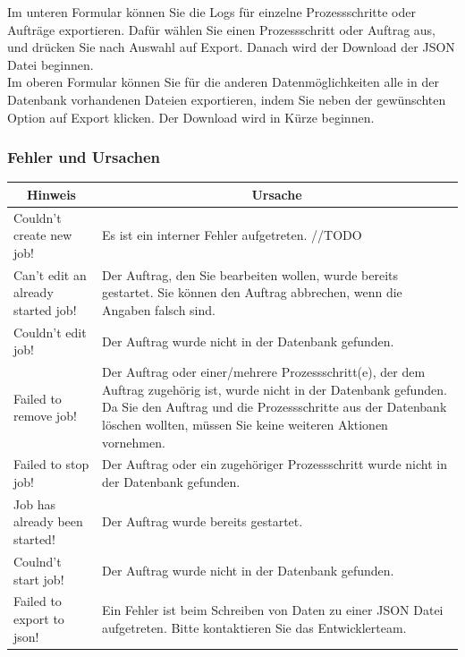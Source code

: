 \documentclass[enabledeprecatedfontcommands,fontsize=12pt,paper=a4,twoside]{scrartcl}
\begin{document}
Im unteren Formular können Sie die Logs für einzelne Prozessschritte oder Aufträge exportieren. Dafür wählen Sie einen Prozessschritt oder Auftrag aus, und drücken Sie nach Auswahl auf Export. Danach wird der Download der JSON Datei beginnen. \\

Im oberen Formular können Sie für die anderen Datenmöglichkeiten alle in der Datenbank vorhandenen Dateien exportieren, indem Sie neben der gewünschten Option auf Export klicken. Der Download wird in Kürze beginnen. \\

\subsubsection{Fehler und Ursachen}
\begin{longtable}[c]{|p{5cm}|p{10cm}|}
\hline
\multicolumn{1}{|c|}{\textbf{Hinweis}}                          & \multicolumn{1}{c|}{\textbf{Ursache}}                                                                                                                                                                                                               \\ \hline
\endhead
Couldn't create new job! &Es ist ein interner Fehler aufgetreten. //TODO \\ \hline
Can't edit an already started job! & Der Auftrag, den Sie bearbeiten wollen, wurde bereits gestartet. Sie können den Auftrag abbrechen, wenn die Angaben falsch sind. \\ \hline
Couldn't edit job! & Der Auftrag wurde nicht in der Datenbank gefunden. \\ \hline
Failed to remove job! & Der Auftrag oder einer/mehrere Prozessschritt(e), der dem Auftrag zugehörig ist, wurde nicht in der Datenbank gefunden. Da Sie den Auftrag und die Prozessschritte aus der Datenbank löschen wollten, müssen Sie keine weiteren Aktionen vornehmen. \\ \hline
Failed to stop job!  & Der Auftrag oder ein zugehöriger Prozessschritt wurde nicht in der Datenbank gefunden.  \\ \hline
Job has already been started!  & Der Auftrag wurde bereits gestartet. \\ \hline
Coulnd't start job! & Der Auftrag wurde nicht in der Datenbank gefunden.\\ \hline
Failed to export to json! & Ein Fehler ist beim Schreiben von Daten zu einer JSON Datei aufgetreten. Bitte kontaktieren Sie das Entwicklerteam.  \\ \hline

\end{longtable}
\end{document}
